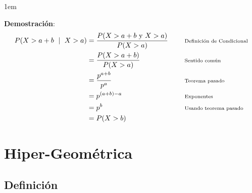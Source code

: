 \documentclass[12pt, fleqn]{report}                             %
\newenvironment{SmallIndentation}[1][0.75em]                    %
        {\begin{adjustwidth}{#1}{}\begin{footnotesize}}             %
        {\end{footnotesize}\end{adjustwidth}}                       %
\DeclareMathOperator \Space     {\quad}                         %
\DeclareMathOperator \MiniSpace {\;}                            %
\newcommand \Such           {\MiniSpace | \MiniSpace}           %
\newcommand \Remember[1]    {\Space\text{\scriptsize{#1}}}      %
\theoremstyle{break}                                            %
\begin{document}
\begin{itemize}
                        \begin{SmallIndentation}[1em]
                            \textbf{Demostración}:
                            \begin{align*}
                                P(X > a + b \Such X > a)
                                    &= \frac{P(X > a + b \text{ y } X > a)}{P(X > a)}    
                                        && \Remember{Definición de Condicional}     \\
                                    &= \frac{P(X > a + b)}{P(X > a)}    
                                        && \Remember{Sentido común}                 \\
                                    &= \frac{p^{a+b}}{p^a}
                                        && \Remember{Teorema pasado}                \\
                                    &= p^{(a+b)-a}
                                        && \Remember{Exponentes}                    \\
                                    &= p^b
                                        && \Remember{Usando teorema pasado}         \\
                                    &= P(X > b)
                            \end{align*}    
                        
                        
                        \end{SmallIndentation}
                            
                \end{itemize}
 

        \clearpage
        \section{Hiper-Geométrica}

            \subsection{Definición}
\end{document}
